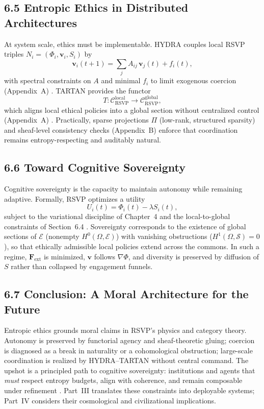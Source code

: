 \documentclass[12pt]{article}
\begin{document}
\subsection*{6.5 Entropic Ethics in Distributed Architectures}
At system scale, ethics must be implementable. HYDRA couples local RSVP triples
\(N_i=(\Phi_i,\mathbf{v}_i,S_i)\) by
\[
\mathbf{v}_i(t+1)=\sum_j A_{ij}\,\mathbf{v}_j(t)+f_i(t),
\]
with spectral constraints on \(A\) and minimal \(f_i\) to limit exogenous coercion
(Appendix~A) \citep{bird1988}. TARTAN provides the functor
\[
T:\mathcal{C}_{\text{RSVP}}^{\mathrm{local}}\to\mathcal{C}_{\text{RSVP}}^{\mathrm{global}},
\]
which aligns local ethical policies into a global section without centralized control
(Appendix~A) \citep{milewski2018}. Practically, sparse projections \(\Pi\) (low-rank,
structured sparsity) and sheaf-level consistency checks (Appendix~B) enforce that
coordination remains entropy-respecting and auditably natural.

\subsection*{6.6 Toward Cognitive Sovereignty}
Cognitive sovereignty is the capacity to maintain autonomy while remaining adaptive.
Formally, RSVP optimizes a utility
\[
U_i(t)=\Phi_i(t)-\lambda S_i(t),
\]
subject to the variational discipline of Chapter~4 and the local-to-global constraints of
Section~6.4 \citep{hanson2003, ortega1957}. Sovereignty corresponds to the existence of
global sections of \(\mathcal{E}\) (nonempty \(H^0(\Omega,\mathcal{E})\)) with vanishing obstructions
(\(H^1(\Omega,\mathcal{S})=0\)), so that ethically admissible local policies extend across the
commons. In such a regime, \(\mathbf{F}_{\mathrm{ext}}\) is minimized, \(\mathbf{v}\) follows \(\nabla\Phi\), and
diversity is preserved by diffusion of \(S\) rather than collapsed by engagement funnels.

\subsection*{6.7 Conclusion: A Moral Architecture for the Future}
Entropic ethics grounds moral claims in RSVP’s physics and category theory. Autonomy
is preserved by functorial agency and sheaf-theoretic gluing; coercion is diagnosed as a
break in naturality or a cohomological obstruction; large-scale coordination is realized by
HYDRA–TARTAN without central command. The upshot is a principled path to cognitive
sovereignty: institutions and agents that \emph{must} respect entropy budgets, align with
coherence, and remain composable under refinement \citep{whitehead1978, deleuze1987}.
Part~III translates these constraints into deployable systems; Part~IV considers their
cosmological and civilizational implications.
\end{document}
